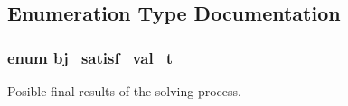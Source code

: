 \subsection{Enumeration Type Documentation}
\subsubsection[{\texorpdfstring{bj\+\_\+satisf\+\_\+val\+\_\+t}{bj_satisf_val_t}}]{\setlength{\rightskip}{0pt plus 5cm}enum {\bf bj\+\_\+satisf\+\_\+val\+\_\+t}}\hypertarget{group__docgrp___a_p_i_ga9aba221730ab694a549d25ee1aa28c69}{}\label{group__docgrp___a_p_i_ga9aba221730ab694a549d25ee1aa28c69}


Posible final results of the solving process. 

